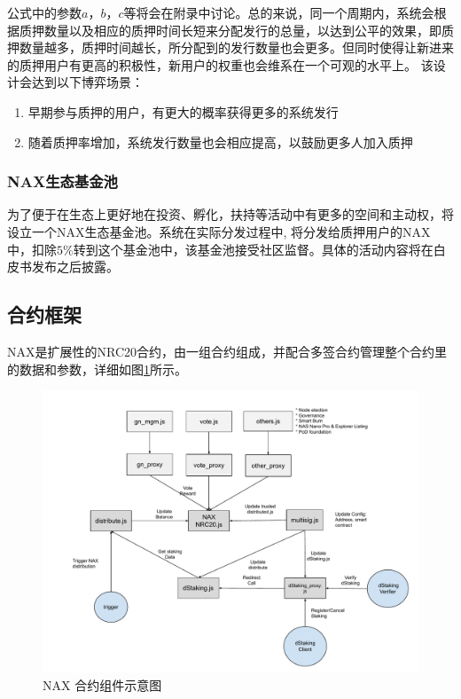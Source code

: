 公式中的参数$a$，$b$，$c$等将会在附录中讨论。总的来说，同一个周期内，系统会根据质押数量以及相应的质押时间长短来分配发行的总量，以达到公平的效果，即质押数量越多，质押时间越长，所分配到的发行数量也会更多。但同时使得让新进来的质押用户有更高的积极性，新用户的权重也会维系在一个可观的水平上。 该设计会达到以下博弈场景：

\begin{enumerate}[\hspace{1cm}(a)]
  \item 早期参与质押的用户，有更大的概率获得更多的系统发行
  \item 随着质押率增加，系统发行数量也会相应提高，以鼓励更多人加入质押
\end{enumerate}

\subsubsection{NAX生态基金池}
为了便于在生态上更好地在投资、孵化，扶持等活动中有更多的空间和主动权，将设立一个NAX生态基金池。系统在实际分发过程中, 将分发给质押用户的NAX中，扣除$5\%$转到这个基金池中，该基金池接受社区监督。具体的活动内容将在白皮书发布之后披露。

\subsection{合约框架}
NAX是扩展性的NRC20合约，由一组合约组成，并配合多签合约管理整个合约里的数据和参数，详细如图\ref{fig:nax_framework}所示。

\begin{figure}[h]
  \centering
    \includegraphics[width=1\textwidth]{../common/nax.pdf}
    \caption{NAX 合约组件示意图 \label{fig:nax_framework}}
\end{figure}
